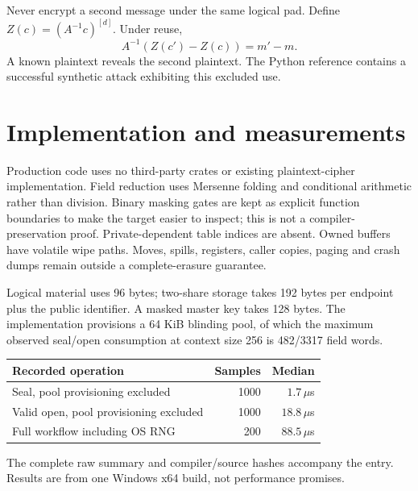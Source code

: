 \documentclass[11pt]{article}
\begin{document}
Never encrypt a second message under the same logical pad. Define
$Z(c)=(A^{-1}c)^{[d]}$. Under reuse,
\[
A^{-1}(Z(c')-Z(c))=m'-m.
\]
A known plaintext reveals the second plaintext. The Python reference
contains a successful synthetic attack exhibiting this excluded use.

\section{Implementation and measurements}
Production code uses no third-party crates or existing plaintext-cipher
implementation. Field reduction uses Mersenne folding and conditional
arithmetic rather than division. Binary masking gates are kept as explicit
function boundaries to make the target easier to inspect; this is not a
compiler-preservation proof. Private-dependent table indices are absent.
Owned buffers have volatile wipe paths. Moves, spills, registers, caller
copies, paging and crash dumps remain outside a complete-erasure guarantee.

Logical material uses 96 bytes; two-share storage takes 192 bytes per
endpoint plus the public identifier. A masked master key takes 128 bytes.
The implementation provisions a 64 KiB blinding pool, of which the maximum
observed seal/open consumption at context size 256 is 482/3317 field words.

\begin{center}
\begin{tabular}{lrr}
\toprule
Recorded operation & Samples & Median\\
\midrule
Seal, pool provisioning excluded & 1000 & $1.7\,\mu$s\\
Valid open, pool provisioning excluded & 1000 & $18.8\,\mu$s\\
Full workflow including OS RNG & 200 & $88.5\,\mu$s\\
\bottomrule
\end{tabular}
\end{center}
The complete raw summary and compiler/source hashes accompany the entry.
Results are from one Windows x64 build, not performance promises.
\end{document}
